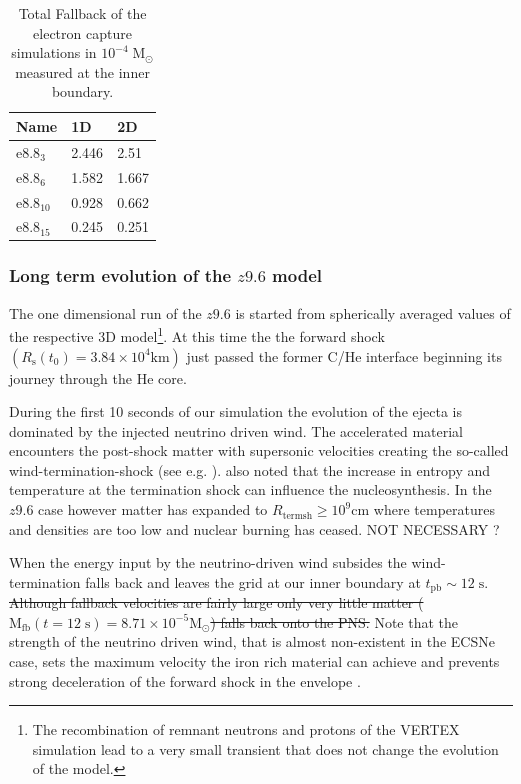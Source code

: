 \documentclass[fleqn,usenatbib]{mnras}
\newcommand{\vertex}{\textsc{V{\footnotesize ERTEX}}\xspace}
\newcommand{\GEO}[2]{{\color{red}\sout{#1}#2}}
\newcommand{\COM}[1]{{\color{red}#1}}
\begin{document}
\begin{table}
  \begin{tabular}{l| l | l }
  Name & 1D & 2D \\
  \hline \hline
  $\mathrm{e}8.8_{3}$ & 2.446   &   2.51  \\
  $\mathrm{e}8.8_{6}$ & 1.582   &   1.667  \\
  $\mathrm{e}8.8_{10}$ & 0.928  &   0.662  \\
  $\mathrm{e}8.8_{15}$ & 0.245  &   0.251 \\
  \end{tabular}
    \caption{Total Fallback of the electron capture simulations in $\mathrm{10^{-4}\;M_{\odot}}$ measured at the inner boundary. }
    \label{table:long term overview}
\end{table}

\subsubsection{Long term evolution of the $z9.6$ model}
\label{subsec:z96 1d}
The one dimensional run of the $z9.6$ is started from spherically averaged values of the respective 3D model\footnote{The recombination of remnant neutrons and protons of the \vertex simulation lead to a very small transient that does not change the evolution of the model.}. At this time the the forward shock $(R_{\mathrm{s}}(t_0) = 3.84\times 10^4 \mathrm{km})$ just passed the former C/He interface beginning its journey through the He core.

During the first 10 seconds of our simulation the evolution of the ejecta is dominated by the injected neutrino driven wind. The accelerated material encounters the post-shock matter with supersonic velocities creating the so-called wind-termination-shock (see e.g. \citet{Arcones2006}). \COM{\citet{Arcones2006} also noted that the increase in entropy and temperature at the termination shock can influence the nucleosynthesis. In the $z9.6$ case however matter has expanded to  $R_{\mathrm{term sh}} \geq 10^{9}\mathrm{cm}$ where temperatures and densities are too low and nuclear burning has ceased. NOT NECESSARY ?} 

When the energy input by the neutrino-driven wind subsides the wind-termination falls back and leaves the grid at our inner boundary at $t_{\mathrm{pb}}\sim 12\;\mathrm{s}$. \GEO{Although fallback velocities are fairly large only very little matter ($\mathrm{M_{fb}}(t=12\;\mathrm{s})=8.71\times 10^{-5}\mathrm{M_{\odot}}$) falls back onto the PNS.}{} Note that the strength of the neutrino driven wind, that is almost non-existent in the ECSNe case, sets the maximum velocity the iron rich material can achieve and prevents strong deceleration of the forward shock in the envelope \citep{Wongwathanarat2015}. 
\end{document}
